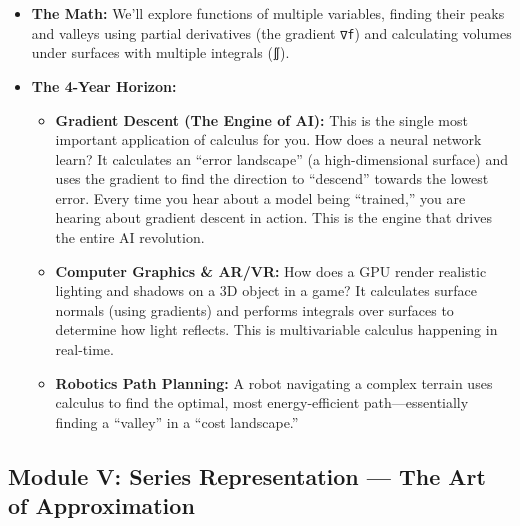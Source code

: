 \documentclass[
  letterpaper,
  DIV=11,
  numbers=noendperiod]{scrreprt}
\providecommand{\tightlist}{%
  \setlength{\itemsep}{0pt}\setlength{\parskip}{0pt}}
\begin{document}
\begin{itemize}
\tightlist
\item
  \textbf{The Math:} We'll explore functions of multiple variables,
  finding their peaks and valleys using partial derivatives (the
  gradient \texttt{∇f}) and calculating volumes under surfaces with
  multiple integrals (\texttt{∬}).
\item
  \textbf{The 4-Year Horizon:}

  \begin{itemize}
  \tightlist
  \item
    \textbf{Gradient Descent (The Engine of AI):} This is the single
    most important application of calculus for you. How does a neural
    network learn? It calculates an ``error landscape'' (a
    high-dimensional surface) and uses the gradient to find the
    direction to ``descend'' towards the lowest error. Every time you
    hear about a model being ``trained,'' you are hearing about gradient
    descent in action. This is the engine that drives the entire AI
    revolution.
  \item
    \textbf{Computer Graphics \& AR/VR:} How does a GPU render realistic
    lighting and shadows on a 3D object in a game? It calculates surface
    normals (using gradients) and performs integrals over surfaces to
    determine how light reflects. This is multivariable calculus
    happening in real-time.
  \item
    \textbf{Robotics Path Planning:} A robot navigating a complex
    terrain uses calculus to find the optimal, most energy-efficient
    path---essentially finding a ``valley'' in a ``cost landscape.''
  \end{itemize}
\end{itemize}

\subsection{Module V: Series Representation --- The Art of
Approximation}\label{module-v-series-representation-the-art-of-approximation}
\end{document}

